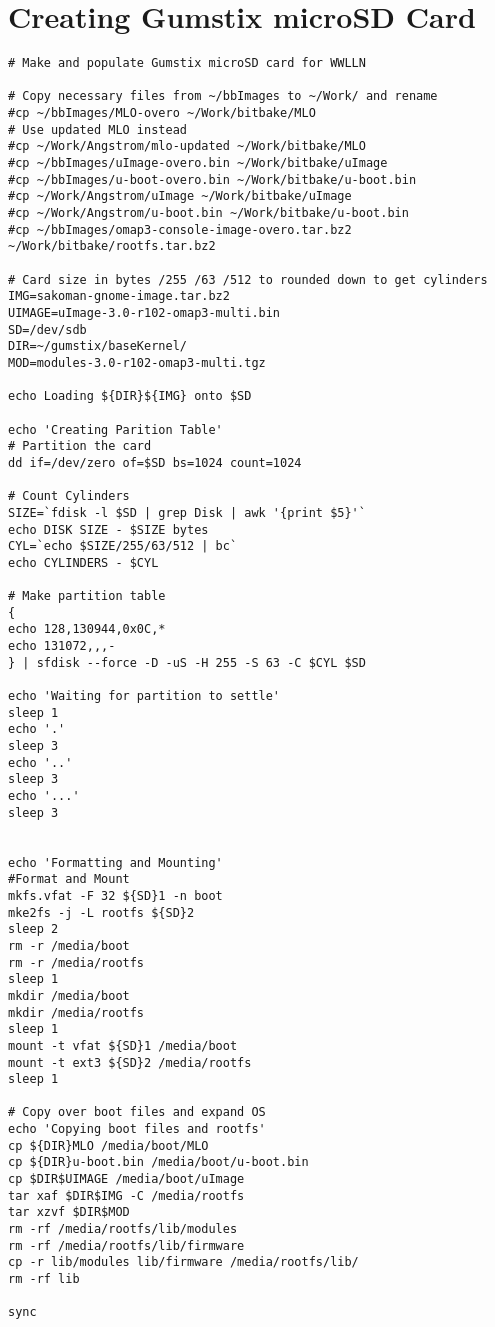 \section{Creating Gumstix microSD Card}

\begin{verbatim}
# Make and populate Gumstix microSD card for WWLLN

# Copy necessary files from ~/bbImages to ~/Work/ and rename
#cp ~/bbImages/MLO-overo ~/Work/bitbake/MLO
# Use updated MLO instead
#cp ~/Work/Angstrom/mlo-updated ~/Work/bitbake/MLO
#cp ~/bbImages/uImage-overo.bin ~/Work/bitbake/uImage
#cp ~/bbImages/u-boot-overo.bin ~/Work/bitbake/u-boot.bin
#cp ~/Work/Angstrom/uImage ~/Work/bitbake/uImage
#cp ~/Work/Angstrom/u-boot.bin ~/Work/bitbake/u-boot.bin
#cp ~/bbImages/omap3-console-image-overo.tar.bz2 ~/Work/bitbake/rootfs.tar.bz2

# Card size in bytes /255 /63 /512 to rounded down to get cylinders
IMG=sakoman-gnome-image.tar.bz2
UIMAGE=uImage-3.0-r102-omap3-multi.bin
SD=/dev/sdb
DIR=~/gumstix/baseKernel/
MOD=modules-3.0-r102-omap3-multi.tgz

echo Loading ${DIR}${IMG} onto $SD

echo 'Creating Parition Table'
# Partition the card
dd if=/dev/zero of=$SD bs=1024 count=1024

# Count Cylinders
SIZE=`fdisk -l $SD | grep Disk | awk '{print $5}'` 
echo DISK SIZE - $SIZE bytes
CYL=`echo $SIZE/255/63/512 | bc`
echo CYLINDERS - $CYL

# Make partition table
{
echo 128,130944,0x0C,*
echo 131072,,,-
} | sfdisk --force -D -uS -H 255 -S 63 -C $CYL $SD

echo 'Waiting for partition to settle'
sleep 1
echo '.'
sleep 3
echo '..'
sleep 3
echo '...'
sleep 3


echo 'Formatting and Mounting'
#Format and Mount
mkfs.vfat -F 32 ${SD}1 -n boot
mke2fs -j -L rootfs ${SD}2
sleep 2
rm -r /media/boot
rm -r /media/rootfs
sleep 1
mkdir /media/boot
mkdir /media/rootfs
sleep 1
mount -t vfat ${SD}1 /media/boot
mount -t ext3 ${SD}2 /media/rootfs
sleep 1

# Copy over boot files and expand OS
echo 'Copying boot files and rootfs'
cp ${DIR}MLO /media/boot/MLO
cp ${DIR}u-boot.bin /media/boot/u-boot.bin
cp $DIR$UIMAGE /media/boot/uImage
tar xaf $DIR$IMG -C /media/rootfs
tar xzvf $DIR$MOD
rm -rf /media/rootfs/lib/modules
rm -rf /media/rootfs/lib/firmware
cp -r lib/modules lib/firmware /media/rootfs/lib/
rm -rf lib

sync


\end{verbatim}
